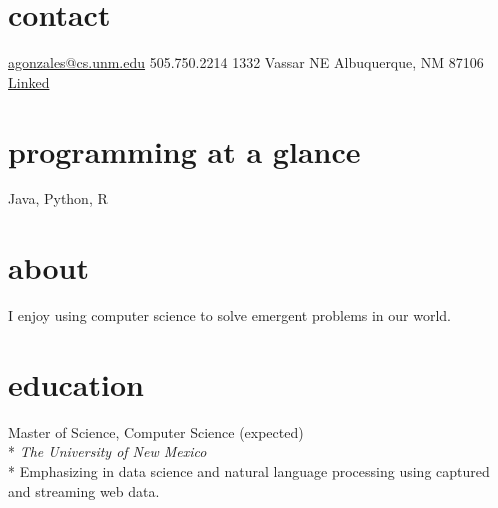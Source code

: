 \documentclass[]{friggeri-cv} %
\begin{document}


\begin{aside} %
\section{contact}
\href{mailto:agonzales@cs.unm.edu}{agonzales@cs.unm.edu}
505.750.2214
1332 Vassar NE
Albuquerque, NM 87106
\href{http://lnkd.in/b8kfQSe}{Linked\scriptsize{\faLinkedin}}
~
\section{programming at a glance}
Java, Python, R
~
\section{about}
I enjoy using computer science to solve emergent problems in our world.
\end{aside}



\thispagestyle{empty}
\section{education}
\begin{description}
  \item {\largeheaderfont Master of Science, Computer Science}  \hfill 
    { (expected)} \\*
    {\footnotesize \emph{The University of New Mexico  }} \\*
    Emphasizing in data science and natural language processing 
    using captured and streaming web data.
\end{description}
\end{document}
